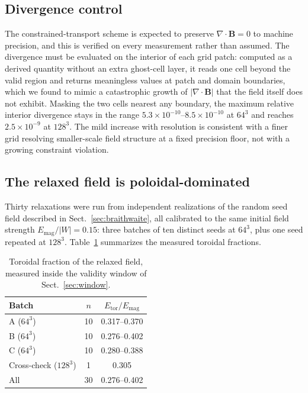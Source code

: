 \documentclass{aa}
\begin{document}
\subsection{Divergence control}
\label{sec:divb}

The constrained-transport scheme is expected to preserve
$\nabla\!\cdot\!\mathbf{B} = 0$ to machine precision, and this is
verified on every measurement rather than assumed. The divergence must
be evaluated on the interior of each grid patch: computed as a derived
quantity without an extra ghost-cell layer, it reads one cell beyond
the valid region and returns meaningless values at patch and domain
boundaries, which we found to mimic a catastrophic growth of
$|\nabla\!\cdot\!\mathbf{B}|$ that the field itself does not exhibit.
Masking the two cells nearest any boundary, the maximum relative
interior divergence stays in the range
$5.3\times10^{-10}$--$8.5\times10^{-10}$ at $64^3$ and reaches
$2.5\times10^{-9}$ at $128^3$. The mild increase with resolution is
consistent with a finer grid resolving smaller-scale field structure at
a fixed precision floor, not with a growing constraint violation.

\subsection{The relaxed field is poloidal-dominated}
\label{sec:seedstudy}

Thirty relaxations were run from independent realizations of the random
seed field described in Sect.~\ref{sec:braithwaite}, all calibrated to
the same initial field strength $E_{\mathrm{mag}}/|W| = 0.15$: three
batches of ten distinct seeds at $64^3$, plus one seed repeated at
$128^3$. Table~\ref{tab:seeds} summarizes the measured toroidal
fractions.

\begin{table}
\caption{Toroidal fraction of the relaxed field, measured inside the
validity window of Sect.~\ref{sec:window}.}
\label{tab:seeds}
\centering
\begin{tabular}{l c c}
\hline\hline
Batch & $n$ & $E_{\mathrm{tor}}/E_{\mathrm{mag}}$ \\
\hline
A ($64^3$)              & 10 & 0.317--0.370 \\
B ($64^3$)              & 10 & 0.276--0.402 \\
C ($64^3$)              & 10 & 0.280--0.388 \\
Cross-check ($128^3$)   &  1 & 0.305 \\
\hline
All                     & 30 & 0.276--0.402 \\
\hline
\end{tabular}
\end{table}
\end{document}
